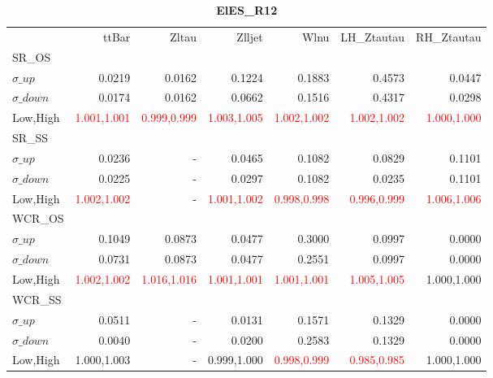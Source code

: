 \documentclass[11pt,oneside,a4paper]{article}
\begin{document}
\begin{table}
\caption{\bf{ElES\_R12}}
\centering
\begin{tabular}{lrrrrrr}
& ttBar & Zltau & Zlljet & Wlnu & LH\_Ztautau & RH\_Ztautau \\

SR\_OS &  &  &  &  &  &  \\
$\sigma\_up$ & 0.0219 & 0.0162 & 0.1224 & 0.1883 & 0.4573 & 0.0447 \\
$\sigma\_down$ & 0.0174 & 0.0162 & 0.0662 & 0.1516 & 0.4317 & 0.0298 \\
Low,High & \textcolor{red}{1.001,1.001} & \textcolor{red}{0.999,0.999} & \textcolor{red}{1.003,1.005} & \textcolor{red}{1.002,1.002} & \textcolor{red}{1.002,1.002} & \textcolor{red}{1.000,1.000} \\

\hline
SR\_SS &  &  &  &  &  &  \\
$\sigma\_up$ & 0.0236 & - & 0.0465 & 0.1082 & 0.0829 & 0.1101 \\
$\sigma\_down$ & 0.0225 & - & 0.0297 & 0.1082 & 0.0235 & 0.1101 \\
Low,High & \textcolor{red}{1.002,1.002} & - & \textcolor{red}{1.001,1.002} & \textcolor{red}{0.998,0.998} & \textcolor{red}{0.996,0.999} & \textcolor{red}{1.006,1.006} \\

\hline
WCR\_OS &  &  &  &  &  &  \\
$\sigma\_up$ & 0.1049 & 0.0873 & 0.0477 & 0.3000 & 0.0997 & 0.0000 \\
$\sigma\_down$ & 0.0731 & 0.0873 & 0.0477 & 0.2551 & 0.0997 & 0.0000 \\
Low,High & \textcolor{red}{1.002,1.002} & \textcolor{red}{1.016,1.016} & \textcolor{red}{1.001,1.001} & \textcolor{red}{1.001,1.001} & \textcolor{red}{1.005,1.005} & 1.000,1.000 \\

\hline
WCR\_SS &  &  &  &  &  &  \\
$\sigma\_up$ & 0.0511 & - & 0.0131 & 0.1571 & 0.1329 & 0.0000 \\
$\sigma\_down$ & 0.0040 & - & 0.0200 & 0.2583 & 0.1329 & 0.0000 \\
Low,High & 1.000,1.003 & - & 0.999,1.000 & \textcolor{red}{0.998,0.999} & \textcolor{red}{0.985,0.985} & 1.000,1.000 \\

\end{tabular}
\end{table}
\end{document}
